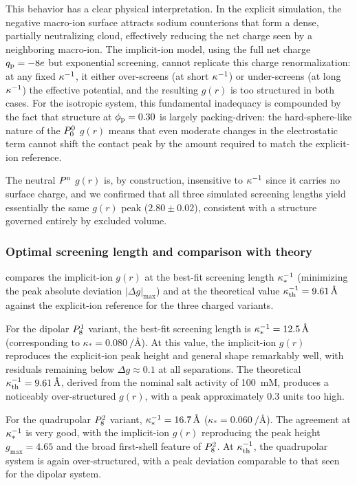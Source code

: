 \documentclass{article}
\begin{document}
This behavior has a clear physical interpretation.
In the explicit simulation, the negative macro-ion surface attracts sodium counterions that form a dense, partially neutralizing cloud, effectively reducing the net charge seen by a neighboring macro-ion.
The implicit-ion model, using the full net charge $q_{\mathrm{p}} = -8e$ but exponential screening, cannot replicate this charge renormalization: at any fixed $\kappa^{-1}$, it either over-screens (at short $\kappa^{-1}$) or under-screens (at long $\kappa^{-1}$) the effective potential, and the resulting $g(r)$ is too structured in both cases.
For the isotropic system, this fundamental inadequacy is compounded by the fact that structure at $\phi_\mathrm{p} = 0.30$ is largely packing-driven: the hard-sphere-like nature of the $P^{0}_{0}$ $g(r)$ means that even moderate changes in the electrostatic term cannot shift the contact peak by the amount required to match the explicit-ion reference.

The neutral $P^\mathrm{n}$ $g(r)$ is, by construction, insensitive to $\kappa^{-1}$ since it carries no surface charge, and we confirmed that all three simulated screening lengths yield essentially the same $g(r)$ peak ($2.80 \pm 0.02$), consistent with a structure governed entirely by excluded volume.

\subsubsection{Optimal screening length and comparison with theory \label{sec:best_kappa}}

 compares the implicit-ion $g(r)$ at the best-fit screening length $\kappa^{-1}_*$ (minimizing the peak absolute deviation $|\Delta g|_\text{max}$) and at the theoretical value $\kappa^{-1}_\mathrm{th} = \qty{9.61}{\angstrom}$ against the explicit-ion reference for the three charged variants.

For the dipolar $P^{1}_{8}$ variant, the best-fit screening length is $\kappa^{-1}_* = \qty{12.5}{\angstrom}$ (corresponding to $\kappa_* = \qty{0.080}{\per\angstrom}$).
At this value, the implicit-ion $g(r)$ reproduces the explicit-ion peak height and general shape remarkably well, with residuals remaining below $\Delta g \approx 0.1$ at all separations.
The theoretical $\kappa^{-1}_\mathrm{th} = \qty{9.61}{\angstrom}$, derived from the nominal salt activity of \qty{100}{mM}, produces a noticeably over-structured $g(r)$, with a peak approximately 0.3 units too high.

For the quadrupolar $P^{2}_{8}$ variant, $\kappa^{-1}_* = \qty{16.7}{\angstrom}$ ($\kappa_* = \qty{0.060}{\per\angstrom}$).
The agreement at $\kappa^{-1}_*$ is very good, with the implicit-ion $g(r)$ reproducing the peak height $g_\text{max} = 4.65$ and the broad first-shell feature of $P^{2}_{8}$.
At $\kappa^{-1}_\mathrm{th}$, the quadrupolar system is again over-structured, with a peak deviation comparable to that seen for the dipolar system.
\end{document}
